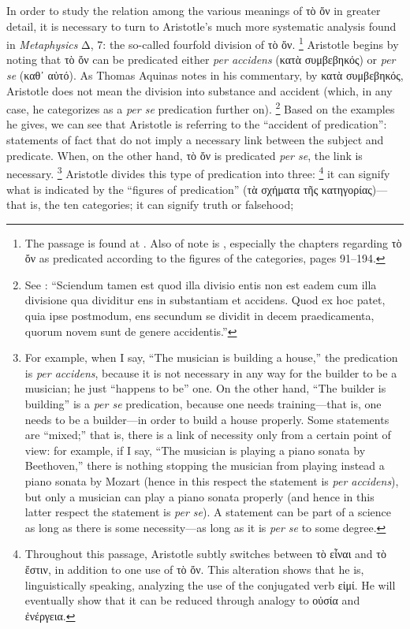 In order to study the relation among the various meanings of τὸ ὄν in greater detail, it is necessary to turn to Aristotle’s much more systematic analysis found in \emph{Metaphysics} Δ, 7: the so-called fourfold division of τὸ ὄν.%
%
\footnote{The passage is found at \cite[Δ,~7, 1017a7-1017b9]{aristotle:metaphysics}. Also of note is \cite{brentano:several}, especially the chapters regarding τὸ ὄν as predicated according to the figures of the categories, pages 91–194.}
%
Aristotle begins by noting that τὸ ὄν can be predicated either \emph{per accidens} (κατὰ συμβεβηκός) or \emph{per se} (καθ᾽ αὑτό). As Thomas Aquinas notes in his commentary, by κατὰ συμβεβηκός, Aristotle does not mean the division into substance and accident (which, in any case, he categorizes as a \emph{per se} predication further on).%
%
\footnote{See \cite[lib.~5, l.~9, n.~1 (Marietti n.~885)]{st:metaph}: “Sciendum tamen est quod illa divisio entis non est eadem cum illa divisione qua dividitur ens in substantiam et accidens. Quod ex hoc patet, quia ipse postmodum, ens secundum se dividit in decem praedicamenta, quorum novem sunt de genere accidentis.”} Based on the examples he gives, we can see that Aristotle is referring to the “accident of predication”: statements of fact that do not imply a necessary link between the subject and predicate. When, on the other hand, τὸ ὄν is predicated \emph{per se}, the link is necessary.%
%
\footnote{For example, when I say, “The musician is building a house,” the predication is \emph{per accidens}, because it is not necessary in any way for the builder to be a musician; he just “happens to be” one. On the other hand, “The builder is building” is a \emph{per se} predication, because one needs training—that is, one needs to be a builder—in order to build a house properly. Some statements are “mixed;” that is, there is a link of necessity only from a certain point of view: for example, if I say, “The musician is playing a piano sonata by Beethoven,” there is nothing stopping the musician from playing instead a piano sonata by Mozart (hence in this respect the statement is \emph{per accidens}), but only a musician can play a piano sonata properly (and hence in this latter respect the statement is \emph{per se}). A statement can be part of a science as long as there is some necessity—as long as it is \emph{per se} to some degree.} Aristotle divides this type of predication into three:%
%
\footnote{Throughout this passage, Aristotle subtly switches between τὸ εἶναι and τὸ ἔστιν, in addition to one use of τὸ ὄν. This alteration shows that he is, linguistically speaking, analyzing the use of the conjugated verb εἰμί. He will eventually show that it can be reduced through analogy to οὐσία and ἐνέργεια.} it can signify what is indicated by the “figures of predication” (τὰ σχήματα τῆς κατηγορίας)—that is, the ten categories; it can signify truth or falsehood;%
